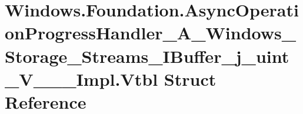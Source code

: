 \hypertarget{struct_windows_1_1_foundation_1_1_async_operation_progress_handler___a___windows___storage___stra482c68c8c7180278b02d484f8142a67}{}\section{Windows.\+Foundation.\+Async\+Operation\+Progress\+Handler\+\_\+\+A\+\_\+\+Windows\+\_\+\+Storage\+\_\+\+Streams\+\_\+\+I\+Buffer\+\_\+j\+\_\+uint\+\_\+\+V\+\_\+\+\_\+\+\_\+\+Impl.\+Vtbl Struct Reference}
\label{struct_windows_1_1_foundation_1_1_async_operation_progress_handler___a___windows___storage___stra482c68c8c7180278b02d484f8142a67}
